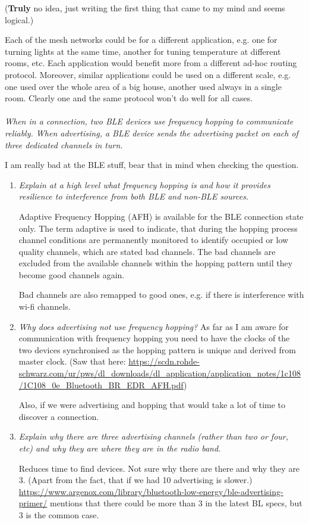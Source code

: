 \documentclass[12pt]{article}
\newcommand*\circled[1]{\tikz[baseline=(char.base)]{
		\node[shape=circle,draw,inner sep=0pt] (char) {#1};}}
\begin{document}
(\textbf{Truly} no idea, just writing the first thing that came to my mind and
seems logical.)

Each of the mesh networks could be for a different application, e.g. one for
turning lights at the same time, another for tuning temperature at different
rooms, etc. Each application would benefit more from a different ad-hoc routing
protocol. Moreover, similar applications could be used on a different scale,
e.g. one used over the whole area of a big house, another used always in
a single room. Clearly one and the same protocol won't do well for all cases.
\\
\\
\textit{\circled{5.} When in a connection, two BLE devices use frequency
hopping to communicate reliably. When advertising, a BLE device sends the
advertising packet on each of three dedicated channels in turn.}

I am really bad at the BLE stuff, bear that in mind when checking the question.
\begin{enumerate}[1.]
    \item \textit{Explain at a high level what frequency hopping
        is and how it provides resilience to interference from both BLE and
        non-BLE sources.}

        Adaptive Frequency Hopping (AFH) is available for the BLE connection
        state only. The term adaptive is used to indicate, that during the
        hopping process channel conditions are permanently monitored to
        identify occupied or low quality channels, which are stated bad
        channels. The bad channels are excluded from the available channels
        within the hopping pattern until they become good channels again.

        Bad channels are also remapped to good ones, e.g. if there is interference with
        wi-fi channels.
    \item \textit{Why does advertising not use frequency hopping?}
        As far as I am aware for communication with frequency hopping you need
        to have the clocks of the two devices synchronised as the hopping
        pattern is unique and derived from master clock. (Saw that here:
        \url{https://scdn.rohde-schwarz.com/ur/pws/dl_downloads/dl_application/application_notes/1c108/1C108_0e_Bluetooth_BR_EDR_AFH.pdf})

        Also, if we were advertising and hopping that would take a lot of time
        to discover a connection.
    \item \textit{Explain why there are three advertising channels
        (rather than two or four, etc) and why they are where they are in the
        radio band.}

        Reduces time to find devices. Not sure why there are there and why they
        are 3. (Apart from the fact, that if we had 10 advertising is slower.)
        \url{https://www.argenox.com/library/bluetooth-low-energy/ble-advertising-primer/}
        mentions that there could be more than $3$ in the latest BL specs, but
        $3$ is the common case.
\end{enumerate}
\end{document}
